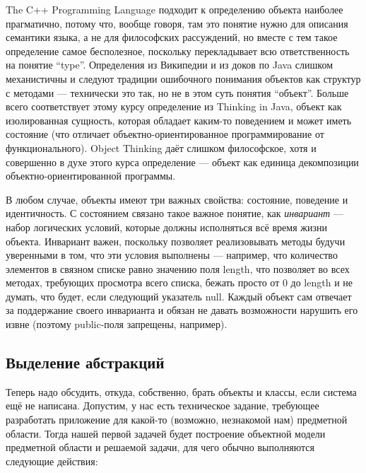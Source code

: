 \documentclass[a5paper]{article}
\begin{document}
The C++ Programming Language подходит к определению объекта наиболее прагматично, потому что, вообще говоря, там это понятие нужно для описания семантики языка, а не для философских рассуждений, но вместе с тем такое определение самое бесполезное, поскольку перекладывает всю ответственность на понятие ``type''. Определения из Википедии и из доков по Java слишком механистичны и следуют традиции ошибочного понимания объектов как структур с методами --- технически это так, но не в этом суть понятия ``объект''. Больше всего соответствует этому курсу определение из Thinking in Java, объект как изолированная сущность, которая обладает каким-то поведением и может иметь состояние (что отличает объектно-ориентированное программирование от функционального). Object Thinking даёт слишком философское, хотя и совершенно в духе этого курса определение --- объект как единица декомпозиции объектно-ориентированной программы.

В любом случае, объекты имеют три важных свойства: состояние, поведение и идентичность. С состоянием связано такое важное понятие, как \textit{инвариант} --- набор логических условий, которые должны исполняться всё время жизни объекта. Инвариант важен, поскольку позволяет реализовывать методы будучи уверенными в том, что эти условия выполнены --- например, что количество элементов в связном списке равно значению поля length, что позволяет во всех методах, требующих просмотра всего списка, бежать просто от 0 до length и не думать, что будет, если следующий указатель null. Каждый объект сам отвечает за поддержание своего инварианта и обязан не давать возможности нарушить его извне (поэтому public-поля запрещены, например).

\subsection{Выделение абстракций}

Теперь надо обсудить, откуда, собственно, брать объекты и классы, если система ещё не написана. Допустим, у нас есть техническое задание, требующее разработать приложение для какой-то (возможно, незнакомой нам) предметной области. Тогда нашей первой задачей будет построение объектной модели предметной области и решаемой задачи, для чего обычно выполняются следующие действия:
\end{document}
